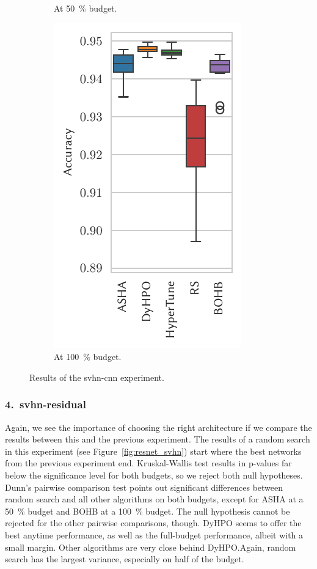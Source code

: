 \begin{figure}[H]
\begin{subfigure}{.26\textwidth}
        \caption{At \SI{50}{\percent} budget.}%
    \end{subfigure}%
    \begin{subfigure}{.26\textwidth}
        \includegraphics[height=\plotheight]{img/real_exp/svhn_simple_boxplot_full.pdf}%
        \caption{At \SI{100}{\percent} budget.}%
    \end{subfigure}%
\caption{Results of the svhn-cnn experiment.}
\label{fig:simple_svhn}
\end{figure}


\subsubsection{4.\ svhn-residual}
Again, we see the importance of choosing the right architecture if we compare the results between this and the previous experiment. The results of a random search in this experiment (see Figure~\ref{fig:resnet_svhn}) start where the best networks from the previous experiment end. Kruskal-Wallis test results in p-values far below the significance level for both budgets, so we reject both null hypotheses. Dunn's pairwise comparison test points out significant differences between random search and all other algorithms on both budgets, except for ASHA at a \SI{50}{\percent} budget and BOHB at a \SI{100}{\percent} budget. The null hypothesis cannot be rejected for the other pairwise comparisons, though. DyHPO seems to offer the best anytime performance, as well as the full-budget performance, albeit with a small margin. Other algorithms are very close behind DyHPO.\@ Again, random search has the largest variance, especially on half of the budget.

